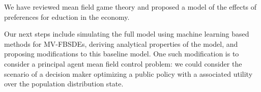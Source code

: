 We have reviewed mean field game theory and proposed a model of the effects of preferences for eduction in the economy.

Our next steps include simulating the full model using machine learning based methods for MV-FBSDEs, deriving analytical properties of the model, and proposing modifications to this baseline model. One such modification is to consider a principal agent mean field control problem: we could consider the scenario of a decision maker optimizing a public policy with a associated utility over the population distribution state.